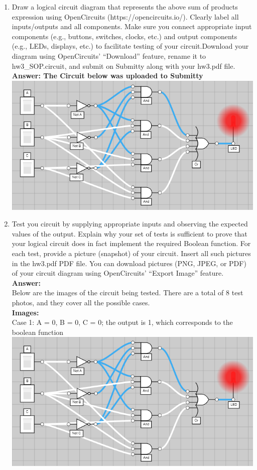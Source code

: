 \documentclass[11pt]{article}
\begin{document}
\begin{enumerate}
    \item Draw a logical circuit diagram that represents the above sum of products expression using OpenCircuits (https://opencircuits.io/). Clearly label all inputs/outputs and all
    components. Make sure you connect appropriate input components (e.g., buttons, switches, clocks, etc.) and output components (e.g., LEDs, displays, etc.) to facilitate testing of
    your circuit.Download your diagram using OpenCircuits' “Download” feature, rename it to
    hw3\_SOP.circuit, and submit on Submitty along with your hw3.pdf file.\\[0.25in]
    \textbf{Answer: The Circuit below was uploaded to Submitty}\\
    \includegraphics[scale=0.6]{0_0_0}
    \item Test you circuit by supplying appropriate inputs and observing the expected values of the
    output. Explain why your set of tests is sufficient to prove that your logical circuit does in
    fact implement the required Boolean function. For each test, provide a picture (snapshot) of
    your circuit. Insert all such pictures in the hw3.pdf PDF file. You can download pictures
    (PNG, JPEG, or PDF) of your circuit diagram using OpenCircuits' “Export Image” feature.\\[0.25in]
    \textbf{Answer:}\\
        Below are the images of the circuit being tested. There are a total of 8 test photos, and they cover all the possible cases.\\[0.55in]
    \textbf{Images:}\\
        Case 1: A = 0, B = 0, C = 0; the output is 1, which corresponds to the boolean function\\
        \includegraphics[scale=0.6]{0_0_0}\\[0.25in]

\end{enumerate}
\end{document}
